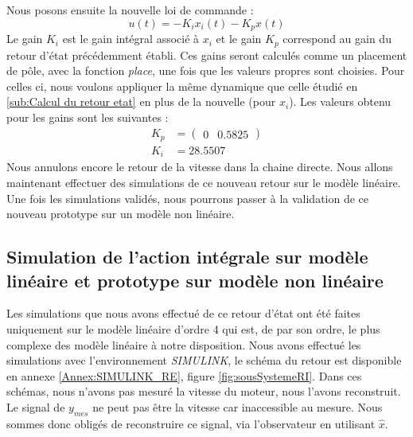 Nous posons ensuite la nouvelle loi de commande :\begin{equation}
		\label{eqn:loideCommande_retourIntegral}
		u(t) = -K_ix_i(t) - K_px(t)
\end{equation}
		Le gain $K_i$ est le gain intégral associé à $x_i$ et le gain $K_p$ correspond au gain du retour d'état précédemment établi. Ces gains seront calculés comme un placement de pôle, avec la fonction \emph{place}, une fois que les valeurs propres sont choisies. Pour celles ci, nous voulons appliquer la même dynamique que celle étudié en \ref{sub:Calcul du retour etat} en plus de la nouvelle (pour $x_i$). Les valeurs obtenu pour les gains sont les suivantes :
		\begin{align}
		K_p &= \begin{pmatrix}
		0&0.5825  
		\end{pmatrix}\\
		K_i &=  28.5507
 		\end{align}
 		Nous annulons encore le retour de la vitesse dans la chaine directe. Nous allons maintenant effectuer des simulations de ce nouveau retour sur le modèle linéaire. Une fois les simulations validés, nous pourrons passer à la validation de ce nouveau prototype sur un modèle non linéaire.
		\subsection{Simulation de l'action intégrale sur modèle linéaire et prototype sur modèle non linéaire}
		Les simulations que nous avons effectué de ce retour d'état ont été faites uniquement sur le modèle linéaire d'ordre 4 qui est, de par son ordre, le plus complexe des modèle linéaire à notre disposition. Nous avons effectué les simulations avec l'environnement \emph{SIMULINK}, le schéma du retour est disponible en annexe \ref{Annex:SIMULINK_RE}, figure \ref{fig:sousSystemeRI}. Dans ces schémas, nous n'avons pas mesuré la vitesse du moteur, nous l'avons reconstruit. Le signal de $y_{mes}$ ne peut pas être la vitesse car inaccessible au mesure. Nous sommes donc obligés de reconstruire ce signal, via l'observateur en utilisant $\hat{x}$.	 
		

